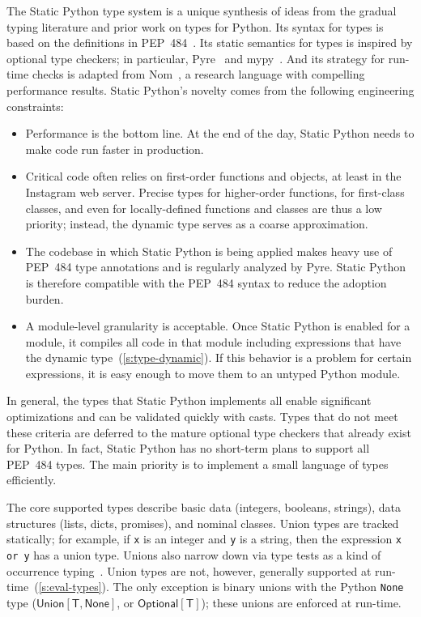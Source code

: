 \documentclass[english,cleveref,submission]{programming}
\newcommand{\SP}{Static Python}
\newcommand{\PEP}{PEP~484}
\newcommand{\code}[1]{\texttt{#1}}
\newcommand{\typefont}[1]{\mathsf{#1}}
\newcommand{\paramtype}[2]{#1[#2]}
\newcommand{\sptype}{\typefont{T}}
\newcommand{\sptnone}{\typefont{None}}
\newcommand{\sptoptional}[1]{\paramtype{\typefont{Optional}}{#1}}
\newcommand{\sptunion}[1]{\paramtype{\typefont{Union}}{#1}}
\begin{document}
The \SP{} type system is a unique synthesis of ideas from the gradual typing literature
and prior work on types for Python.
Its syntax for types is based on the definitions in \PEP{}~\cite{pep484}.
Its static semantics for types is inspired by optional type checkers; in
particular, Pyre~\cite{pyre} and mypy~\cite{mypy}.
And its strategy for run-time checks is adapted from Nom~\cite{mt-oopsla-2017,mt-oopsla-2021},
a research language with compelling performance results.
\SP{}'s novelty comes from the following engineering constraints:
\begin{itemize}
  \item
    Performance is the bottom line.
    At the end of the day, \SP{} needs to make code run faster in production.
  \item
    Critical code often relies on first-order functions and objects,
    at least in the Instagram web server.
    Precise types for higher-order functions, for first-class classes, and even for
    locally-defined functions and classes are thus a low priority; instead, the
    dynamic type serves as a coarse approximation.
  \item
    The codebase in which \SP{} is being applied makes heavy use of
    \PEP{} type annotations and is regularly analyzed by Pyre.
    \SP{} is therefore compatible with the \PEP{} syntax to reduce the
    adoption burden.
  \item
    A module-level granularity is acceptable.
    Once \SP{} is enabled for a module, it compiles all code in that module
    including expressions that have the dynamic type~(\cref{s:type-dynamic}).
    If this behavior is a problem for certain expressions, it is easy enough to move
    them to an untyped Python module.
\end{itemize}
%
In general, the types that \SP{} implements all enable significant optimizations
and can be validated quickly with casts.
Types that do not meet these criteria are deferred to the mature optional
type checkers that already exist for Python.
In fact, \SP{} has no short-term plans to support all \PEP{} types.
The main priority is to implement a small language of types efficiently.

The core supported types describe basic data (integers, booleans, strings),
data structures (lists, dicts, promises),
and nominal classes.
Union types are tracked statically; for example, if \code{x} is an integer and
\code{y} is a string, then the expression \code{x or y} has a union type.
Unions also narrow down via type tests as a kind of occurrence
typing~\cite{tf-icfp-2010,gsk-esop-2011}.
Union types are not, however, generally supported at run-time~(\cref{s:eval-types}).
The only exception is binary unions with the Python \code{None}
type ($\sptunion{\sptype, \sptnone}$, or
$\sptoptional{\sptype}$); these unions are enforced at run-time.
\end{document}
